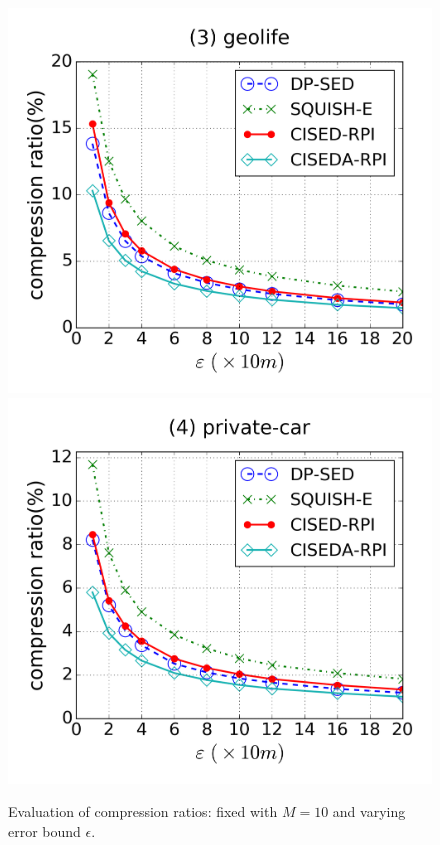 {\begin{figure}[tb!]
\includegraphics[scale = 0.250]{figures/Exp-cr-epsilon-geolife.png}
\includegraphics[scale = 0.250]{figures/Exp-cr-epsilon-private.png}
\vspace{-3ex}
\caption{\small Evaluation of compression ratios: fixed with $M=10$ and varying error bound $\epsilon$.}
\label{fig:cr-m10}
\vspace{-1.0ex}
\end{figure}
}%



